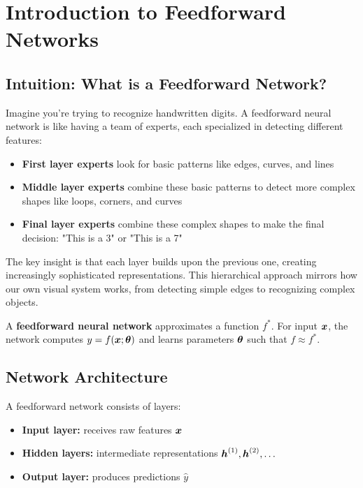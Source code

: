 
\section{Introduction to Feedforward Networks }
\label{sec:intro-feedforward}

\subsection{Intuition: What is a Feedforward Network?}

Imagine you're trying to recognize handwritten digits. A feedforward neural network is like having a team of experts, each specialized in detecting different features:

\begin{itemize}
    \item \textbf{First layer experts} look for basic patterns like edges, curves, and lines
    \item \textbf{Middle layer experts} combine these basic patterns to detect more complex shapes like loops, corners, and curves
    \item \textbf{Final layer experts} combine these complex shapes to make the final decision: "This is a 3" or "This is a 7"
\end{itemize}

The key insight is that each layer builds upon the previous one, creating increasingly sophisticated representations. This hierarchical approach mirrors how our own visual system works, from detecting simple edges to recognizing complex objects.

A \textbf{feedforward neural network} approximates a function $f^*$. For input $\boldsymbol{x}$, the network computes $y = f(\boldsymbol{x}; \boldsymbol{\theta})$ and learns parameters $\boldsymbol{\theta}$ such that $f \approx f^*$.

\subsection{Network Architecture}

A feedforward network consists of layers:
\begin{itemize}
    \item \textbf{Input layer:} receives raw features $\boldsymbol{x}$
    \item \textbf{Hidden layers:} intermediate representations $\boldsymbol{h}^{(1)}, \boldsymbol{h}^{(2)}, \ldots$
    \item \textbf{Output layer:} produces predictions $\hat{y}$
\end{itemize}

